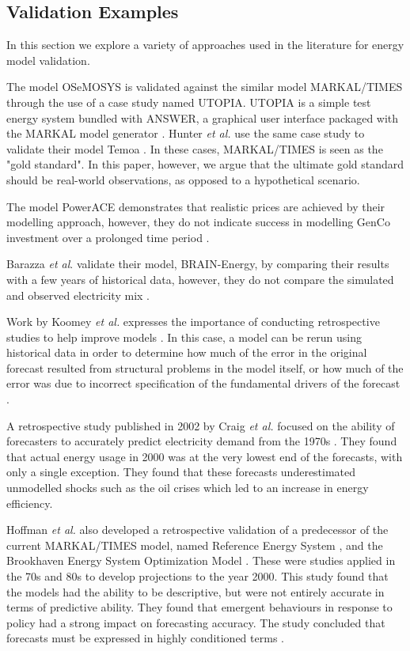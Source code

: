 \subsection{Validation Examples}

In this section we explore a variety of approaches used in the literature for energy model validation.

The model OSeMOSYS \cite{Howells2011} is validated against the similar model MARKAL\slash TIMES through the use of a case study named UTOPIA. UTOPIA is a simple test energy system bundled with ANSWER, a graphical user interface packaged with the MARKAL model generator \cite{Hunter2013, Noble2004}. Hunter \textit{et al.} use the same case study to validate their model Temoa \cite{Hunter2013}. In these cases, MARKAL\slash TIMES is seen as the "gold standard". In this paper, however, we argue that the ultimate gold standard should be real-world observations, as opposed to a hypothetical scenario.

The model PowerACE demonstrates that realistic prices are achieved by their modelling approach, however, they do not indicate success in modelling GenCo investment over a prolonged time period \cite{Ringler2012}.

Barazza \textit{et al}. validate their model, BRAIN-Energy, by comparing their results with a few years of historical data, however, they do not compare the simulated and observed electricity mix \cite{Barazza2020}.

Work by Koomey \textit{et al.} expresses the importance of conducting retrospective studies to help improve models \cite{Koomey2003}. In this case, a model can be rerun using historical data in order to determine how much of the error in the original forecast resulted from structural problems in the model itself, or how much of the error was due to incorrect specification of the fundamental drivers of the forecast \cite{Koomey2003}.

A retrospective study published in 2002 by Craig \textit{et al.} focused on the ability of forecasters to accurately predict electricity demand from the 1970s \cite{Craig2002}. They found that actual energy usage in 2000 was at the very lowest end of the forecasts, with only a single exception. They found that these forecasts underestimated unmodelled shocks such as the oil crises which led to an increase in energy efficiency.

Hoffman \textit{et al.} also developed a retrospective validation of a predecessor of the current MARKAL\slash TIMES model, named Reference Energy System \cite{Hoffman_1973}, and the Brookhaven Energy System Optimization Model \cite{ERDA_48}. These were studies applied in the 70s and 80s to develop projections to the year 2000. This study found that the models had the ability to be descriptive, but were not entirely accurate in terms of predictive ability. They found that emergent behaviours in response to policy had a strong impact on forecasting accuracy. The study concluded that forecasts must be expressed in highly conditioned terms \cite{Hoffman2011}. 



